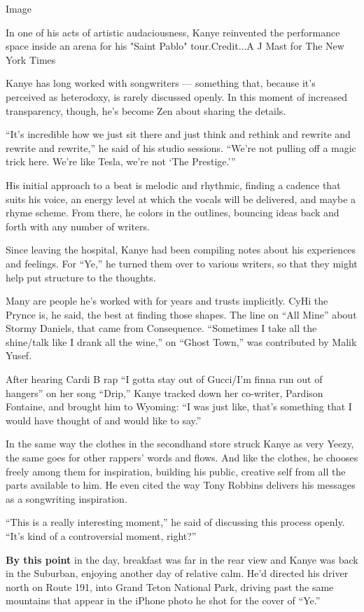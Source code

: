 Image

In one of his acts of artistic audaciousness, Kanye reinvented the
performance space inside an arena for his "Saint Pablo" tour.Credit...A
J Mast for The New York Times

Kanye has long worked with songwriters --- something that, because it's
perceived as heterodoxy, is rarely discussed openly. In this moment of
increased transparency, though, he's become Zen about sharing the
details.

``It's incredible how we just sit there and just think and rethink and
rewrite and rewrite and rewrite,'' he said of his studio sessions.
``We're not pulling off a magic trick here. We're like Tesla, we're not
`The Prestige.'''

His initial approach to a beat is melodic and rhythmic, finding a
cadence that suits his voice, an energy level at which the vocals will
be delivered, and maybe a rhyme scheme. From there, he colors in the
outlines, bouncing ideas back and forth with any number of writers.

Since leaving the hospital, Kanye had been compiling notes about his
experiences and feelings. For ``Ye,'' he turned them over to various
writers, so that they might help put structure to the thoughts.

Many are people he's worked with for years and trusts implicitly. CyHi
the Prynce is, he said, the best at finding those shapes. The line on
``All Mine'' about Stormy Daniels, that came from Consequence.
``Sometimes I take all the shine/talk like I drank all the wine,'' on
``Ghost Town,'' was contributed by Malik Yusef.

After hearing Cardi B rap ``I gotta stay out of Gucci/I'm finna run out
of hangers'' on her song ``Drip,'' Kanye tracked down her co-writer,
Pardison Fontaine, and brought him to Wyoming: ``I was just like, that's
something that I would have thought of and would like to say.''

In the same way the clothes in the secondhand store struck Kanye as very
Yeezy, the same goes for other rappers' words and flows. And like the
clothes, he chooses freely among them for inspiration, building his
public, creative self from all the parts available to him. He even cited
the way Tony Robbins delivers his messages as a songwriting inspiration.

``This is a really interesting moment,'' he said of discussing this
process openly. ``It's kind of a controversial moment, right?''

\textbf{By this point} in the day, breakfast was far in the rear view
and Kanye was back in the Suburban, enjoying another day of relative
calm. He'd directed his driver north on Route 191, into Grand Teton
National Park, driving past the same mountains that appear in the iPhone
photo he shot for the cover of ``Ye.''

